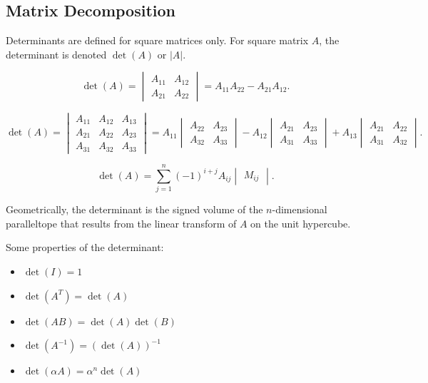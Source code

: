 \subsection{Matrix Decomposition}
\begin{definition}[Determinants]
  Determinants are defined for square matrices only. For square matrix $A$, the
  determinant is denoted $\det(A)$ or $\left| A \right|$.
\end{definition}
\begin{example}
  \[\det(A)=\begin{vmatrix} A_{11}&A_{12}\\A_{21}&A_{22} \end{vmatrix}=A_{11}A_{22}-A_{21}A_{12}.\]
\end{example}
\begin{example}
  \[\det(A)=\begin{vmatrix}
    A_{11}&A_{12}&A_{13}\\A_{21}&A_{22}&A_{23}\\A_{31}&A_{32}&A_{33}\end{vmatrix}
    =A_{11} \begin{vmatrix} A_{22}&A_{23}\\A_{32}&A_{33}\end{vmatrix} -A_{12}
    \begin{vmatrix} A_{21}&A_{23}\\A_{31}&A_{33} \end{vmatrix}
    +A_{13}\begin{vmatrix} A_{21}&A_{22}\\A_{31}&A_{32} \end{vmatrix}.\] 
\end{example}
\begin{example}
  \[\det(A)=\sum_{j=1}^{n} {(-1)}^{i+j}A_{ij}\begin{vmatrix} M_{ij} \end{vmatrix}.\]
\end{example}
Geometrically, the determinant is the signed volume of the $n$-dimensional
paralleltope that results from the linear transform of $A$ on the unit
hypercube.
\begin{remark}
  Some properties of the determinant:
  \begin{itemize}
    \item $\det(I)=1$
    \item $\det(A^{T})=\det(A)$
    \item $\det(AB)=\det(A)\det(B)$ 
    \item $\det(A^{-1})={(\det(A))}^{-1}$ 
    \item $\det(\alpha A)=\alpha^{n}\det(A)$
  \end{itemize}
\end{remark}
